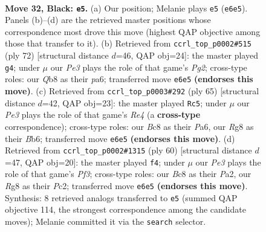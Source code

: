 \documentclass[11pt]{article}
\begin{document}
\clearpage

\begin{figure}[p]\centering
\begin{subfigure}{0.46\textwidth}\centering
\resizebox{\linewidth}{!}{%
\newchessgame
\chessboard[
  setfen={1qb2kr1/p4p2/2p1p2p/2P3p1/4B3/8/P7/3KR3 b - - 1 32},
  showmover=false,
  pgfstyle=straightmove, color=movearrow, markmove={e6-e5}
]}
\caption{}
\end{subfigure}\hfill
\begin{subfigure}{0.46\textwidth}\centering
\resizebox{\linewidth}{!}{%
\newchessgame
\chessboard[
  setfen={7r/7k/pB2pp2/P2b3p/8/5P1P/2R2KP1/8 w - - 4 37},
  showmover=false,
  pgfstyle=straightmove, color=movearrow, markmove={g2-g4}
]}
\caption{}
\end{subfigure}
\\[4pt]
\begin{subfigure}{0.46\textwidth}\centering
\resizebox{\linewidth}{!}{%
\newchessgame
\chessboard[
  setfen={8/kp1B4/pb4pp/4rp2/7P/3R1KP1/PP6/8 b - - 2 33},
  showmover=false,
  pgfstyle=straightmove, color=movearrow, markmove={e5-c5}
]}
\caption{}
\end{subfigure}\hfill
\begin{subfigure}{0.46\textwidth}\centering
\resizebox{\linewidth}{!}{%
\newchessgame
\chessboard[
  setfen={1k2r3/1b6/8/p5b1/1p4B1/3R1P2/PPP1N3/1K6 w - - 2 31},
  showmover=false,
  pgfstyle=straightmove, color=movearrow, markmove={f3-f4}
]}
\caption{}
\end{subfigure}
\caption{\textbf{Move 32, Black: \texttt{e5}.} (a) Our position; Melanie plays \texttt{e5} (\texttt{e6e5}). Panels (b)--(d) are the retrieved master positions whose correspondence most drove this move (highest QAP objective among those that transfer to it). (b) Retrieved from \texttt{ccrl\_top\_p0002\#515} (ply 72) [structural distance $d$=46, QAP obj=24]: the master played \texttt{g4}; under $\mu$ our \emph{Pe3} plays the role of that game's \emph{Pg2}; cross-type roles: our \emph{Q}b8 as their \emph{p}a6; transferred move \texttt{e6e5} \textbf{(endorses this move)}. (c) Retrieved from \texttt{ccrl\_top\_p0003\#292} (ply 65) [structural distance $d$=42, QAP obj=23]: the master played \texttt{Rc5}; under $\mu$ our \emph{Pe3} plays the role of that game's \emph{Re4} (a \textbf{cross-type} correspondence); cross-type roles: our \emph{B}c8 as their \emph{P}a6, our \emph{R}g8 as their \emph{B}b6; transferred move \texttt{e6e5} \textbf{(endorses this move)}. (d) Retrieved from \texttt{ccrl\_top\_p0002\#1315} (ply 60) [structural distance $d$=47, QAP obj=20]: the master played \texttt{f4}; under $\mu$ our \emph{Pe3} plays the role of that game's \emph{Pf3}; cross-type roles: our \emph{B}c8 as their \emph{P}a2, our \emph{R}g8 as their \emph{P}c2; transferred move \texttt{e6e5} \textbf{(endorses this move)}. Synthesis: 8 retrieved analogs transferred to \texttt{e5} (summed QAP objective 114, the strongest correspondence among the candidate moves); Melanie committed it via the \texttt{search} selector.}
\label{fig:thought-m63}
\end{figure}
\end{document}
